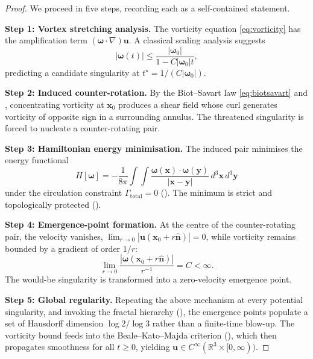 \documentclass[11pt,a4paper]{article}
\theoremstyle{plain}
\theoremstyle{definition}
\begin{document}
\begin{proof}
We proceed in five steps, recording each as a self-contained statement.

\medskip
\noindent\textbf{Step 1: Vortex stretching analysis.}\;
The vorticity equation \eqref{eq:vorticity} has the amplification term
$(\boldsymbol{\omega}\cdot\nabla)\mathbf{u}$. A classical scaling
analysis suggests
\[
|\boldsymbol{\omega}(t)| \le
\frac{|\boldsymbol{\omega}_{0}|}{1 - C|\boldsymbol{\omega}_{0}|t},
\]
predicting a candidate singularity at
$t^{\star} = 1/(C|\boldsymbol{\omega}_{0}|)$.

\medskip
\noindent\textbf{Step 2: Induced counter-rotation.}\;
By the Biot--Savart law \eqref{eq:biotsavart} and ,
concentrating vorticity at $\mathbf{x}_{0}$ produces a shear field
whose curl generates vorticity of opposite sign in a surrounding
annulus. The threatened singularity is forced to nucleate a
counter-rotating pair.

\medskip
\noindent\textbf{Step 3: Hamiltonian energy minimisation.}\;
The induced pair minimises the energy functional
\[
H[\boldsymbol{\omega}] = -\frac{1}{8\pi}\int\!\!\int
   \frac{\boldsymbol{\omega}(\mathbf{x})\cdot\boldsymbol{\omega}(\mathbf{y})}
        {|\mathbf{x}-\mathbf{y}|}\,d^{3}\mathbf{x}\,d^{3}\mathbf{y}
\]
under the circulation constraint $\Gamma_{\mathrm{total}} = 0$
(). The minimum is strict and topologically
protected ().

\medskip
\noindent\textbf{Step 4: Emergence-point formation.}\;
At the centre of the counter-rotating pair, the velocity vanishes,
$\lim_{r\to 0}|\mathbf{u}(\mathbf{x}_{0}+r\hat{\mathbf{n}})| = 0$,
while vorticity remains bounded by a gradient of order $1/r$:
\[
\lim_{r\to 0}
   \frac{|\boldsymbol{\omega}(\mathbf{x}_{0}+r\hat{\mathbf{n}})|}
        {r^{-1}}
   = C < \infty.
\]
The would-be singularity is transformed into a zero-velocity
emergence point.

\medskip
\noindent\textbf{Step 5: Global regularity.}\;
Repeating the above mechanism at every potential singularity, and
invoking the fractal hierarchy (), the emergence
points populate a set of Hausdorff dimension $\log 2/\log 3$ rather
than a finite-time blow-up. The vorticity bound feeds into the
Beale--Kato--Majda criterion (), which then propagates
smoothness for all $t\ge 0$, yielding
$\mathbf{u}\in C^{\infty}(\mathbb{R}^{3}\times[0,\infty))$.
\end{proof}
\end{document}
